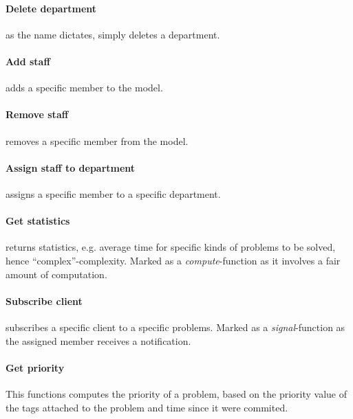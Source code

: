 \paragraph{Delete department} as the name dictates, simply deletes a department. 

\paragraph{Add staff} adds a specific \astaff[] member to the model. 

\paragraph{Remove staff} removes a specific \astaff[] member from the model. 

\paragraph{Assign staff to department} assigns a specific \astaff[] member to a specific department. 

\paragraph{Get statistics} returns statistics, e.g. average time for specific kinds of problems to be solved, hence ``complex''-complexity. Marked as a \textit{compute}-function as it involves a fair amount of computation.
\paragraph{Subscribe client} subscribes a specific client to a specific problems. Marked as a \textit{signal}-function as the assigned \astaff[] member receives a notification. 

\paragraph{Get priority} This functions computes the priority of a problem, based on the priority value of the tags attached to the problem and time since it were commited. 